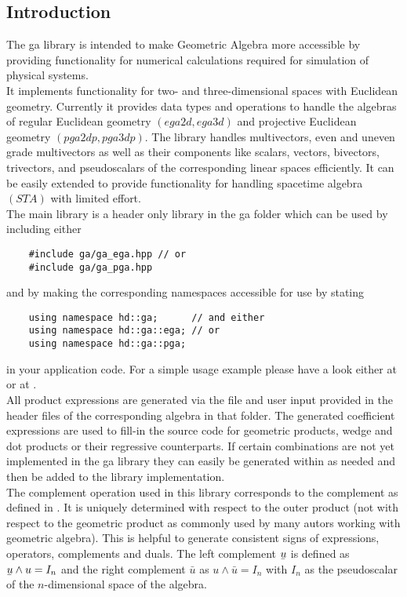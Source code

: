 \subsection{Introduction}
\label{intro}

The ga library is intended to make Geometric Algebra more accessible by providing
functionality for numerical calculations required for simulation of physical systems.
\\

It implements functionality for two- and three-dimensional spaces with Euclidean geometry.
Currently it provides data types and operations to handle the algebras of regular
Euclidean geometry $(ega2d, ega3d)$ and projective Euclidean geometry $(pga2dp, pga3dp)$.
The library handles multivectors, even and uneven grade multivectors as well as their
components like scalars, vectors, bivectors, trivectors, and pseudoscalars of the
corresponding linear spaces efficiently. It can be easily extended to provide
functionality for handling spacetime algebra $(STA)$ with limited effort. \\

The main library is a header only library in the ga folder which can be used by including
either
\begin{verbatim}
    #include ga/ga_ega.hpp // or
    #include ga/ga_pga.hpp
\end{verbatim}
and by making the corresponding namespaces accessible for use by stating
\begin{verbatim}
    using namespace hd::ga;      // and either
    using namespace hd::ga::ega; // or
    using namespace hd::ga::pga;
\end{verbatim}
in your application code. For a simple usage example please have a look either at
 or at .
\\

All product expressions are generated via the file  and
user input provided in the header files of the corresponding algebra in that folder. The
generated coefficient expressions are used to fill-in the source code for geometric
products, wedge and dot products or their regressive counterparts. If certain combinations
are not yet implemented in the ga library they can easily be generated within
 as needed and then be added to the library implementation. \\

The complement operation used in this library corresponds to the complement as defined in
\cite{Lengyel_pga-illuminated:2024}. It is uniquely determined with respect to the outer
product (not with respect to the geometric product as commonly used by many autors working
with geometric algebra). This is helpful to generate consistent signs of expressions,
operators, complements and duals. The left complement $\ubar{u}$ is defined as $\ubar{u}
\wedge u = I_n$ and the right complement $\bar{u}$ as $u \wedge \bar{u} = I_n$ with $I_n$
as the pseudoscalar of the $n$-dimensional space of the algebra. \\


